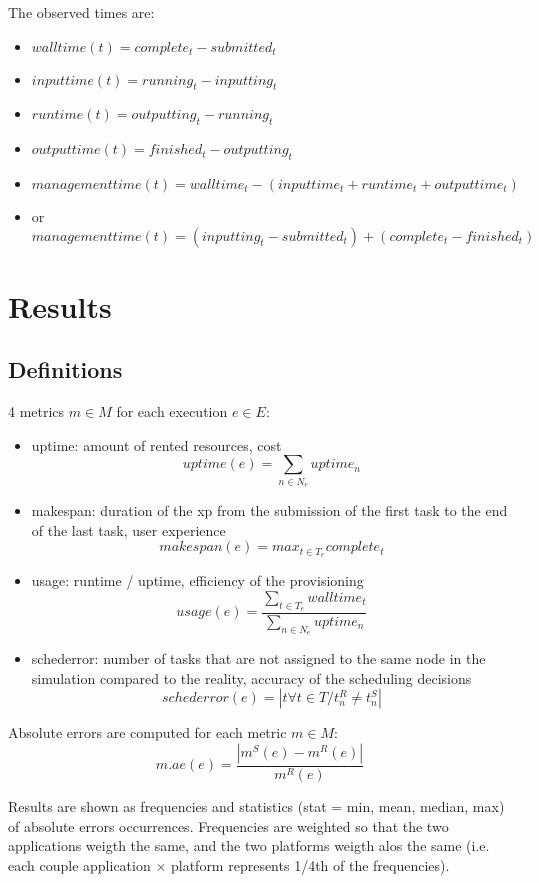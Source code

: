 \documentclass[a4paper,10pt]{article}
\begin{document}
The observed times are:
\begin{itemize}
 \item $walltime(t) = complete_t - submitted_t$ 
 \item $inputtime(t) = running_t - inputting_t$
 \item $runtime(t) = outputting_t - running_t$
 \item $outputtime(t) = finished_t - outputting_t$
 \item $managementtime(t) = walltime_t - (inputtime_t+runtime_t+outputtime_t)$
 \item or $managementtime(t) = (inputting_t - submitted_t) + (complete_t - finished_t)$
\end{itemize}



\section{Results}

\subsection{Definitions}
4 metrics $m \in M$ for each execution $e \in E$:
\begin{itemize}
 \item uptime: amount of rented resources, cost 
  $$uptime(e) = \sum_{n \in N_e} uptime_n$$
 \item makespan: duration of the xp from the submission of the first task to 
the end of the last task, user experience 
  $$makespan(e) = max_{t \in T_e} complete_t$$
 \item usage: runtime / uptime, efficiency of the provisioning 
  $$usage(e) = \frac{\sum_{t \in T_e} walltime_t}{\sum_{n \in N_e} uptime_n}$$
 \item schederror: number of tasks that are not assigned to the same node in 
the simulation compared to the reality, accuracy of the scheduling decisions
  $$schederror(e) = |t \forall t \in T / t_n^R \neq t_n^S|$$

\end{itemize}

Absolute errors are computed for each metric $m \in M$: 
$$m.ae(e) = \frac{| m^S(e) - m^R(e) |}{m^R(e)}$$

Results are shown as frequencies and statistics (stat = min, mean, median, max) 
of absolute errors occurrences. Frequencies are weighted so that the two applications
weigth the same, and the two platforms weigth alos the same 
(i.e. each couple application $\times$ platform represents 1/4th of the frequencies).
\end{document}
